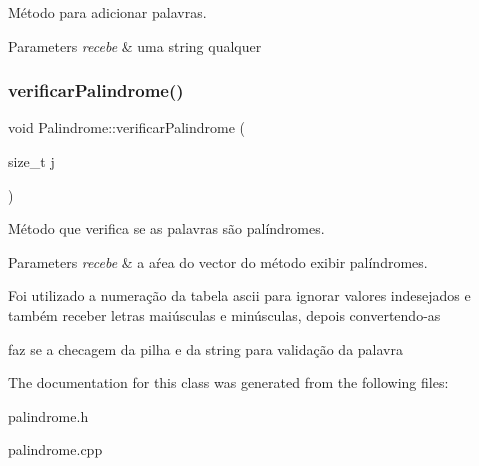 Método para adicionar palavras. 


\begin{DoxyParams}{Parameters}
{\em recebe} & uma string qualquer \\
\hline
\end{DoxyParams}
\mbox{\label{classPalindrome_ad8e712dbed0404e1e123333546954a4f}} 
\subsubsection{\texorpdfstring{verificar\+Palindrome()}{verificarPalindrome()}}
{\footnotesize\ttfamily void Palindrome\+::verificar\+Palindrome (\begin{DoxyParamCaption}\item[{size\+\_\+t}]{j }\end{DoxyParamCaption})}



Método que verifica se as palavras são palíndromes. 


\begin{DoxyParams}{Parameters}
{\em recebe} & a aŕea do vector do método exibir palíndromes. \\
\hline
\end{DoxyParams}
Foi utilizado a numeração da tabela ascii para ignorar valores indesejados e também receber letras maiúsculas e minúsculas, depois convertendo-\/as

faz se a checagem da pilha e da string para validação da palavra

The documentation for this class was generated from the following files\+:\begin{DoxyCompactItemize}
\item 
palindrome.\+h\item 
palindrome.\+cpp\end{DoxyCompactItemize}
